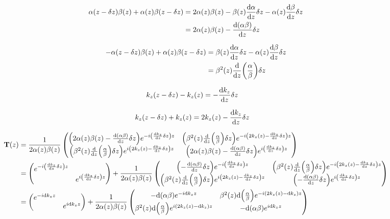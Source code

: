 \begin{align*}
	\alpha\pqty{z-\delta z}\beta\pqty{z} + \alpha\pqty{z}\beta\pqty{z - \delta z} 
	&= 2\alpha\pqty{z}\beta\pqty{z} - \beta\pqty{z}\dv{\alpha}{z}\delta z - \alpha\pqty{z}\dv{\beta}{z}\delta z \\
	&= 2\alpha\pqty{z}\beta\pqty{z} - \dv{\pqty{\alpha\beta}}{z}\delta z
\end{align*}

\begin{align*}
	-\alpha\pqty{z-\delta z}\beta\pqty{z} + \alpha\pqty{z}\beta\pqty{z - \delta z} 
	&= \beta\pqty{z}\dv{\alpha}{z}\delta z - \alpha\pqty{z}\dv{\beta}{z}\delta z \\
	&= \beta^2\pqty{z}\dv{z}\pqty{\frac{\alpha}{\beta}}\delta z
\end{align*}

\begin{align*}
	k_{z}\pqty{z - \delta z}-k_{z}\pqty{z} &= -\dv{k_z}{z}\delta z
\end{align*}

\begin{align*}
	k_{z}\pqty{z - \delta z} + k_{z}\pqty{z} &= 2k_{z}\pqty{z} - \dv{k_z}{z}\delta z
\end{align*}

\begin{align*}
	\vb{T}\pqty{z} &= \frac{1}{2\alpha\pqty{z}\beta\pqty{z}}\pmqty{
		\pqty{2\alpha\pqty{z}\beta\pqty{z} - \dv{\pqty{\alpha\beta}}{z}\delta z}e^{-i\pqty{\dv{k_z}{z}\delta z}z} &
		\pqty{\beta^2\pqty{z}\dv{z}\pqty{\frac{\alpha}{\beta}}\delta z}e^{-i\pqty{2k_{z}\pqty{z} - \dv{k_z}{z}\delta z}z} \\
		\pqty{\beta^2\pqty{z}\dv{z}\pqty{\frac{\alpha}{\beta}}\delta z}e^{i\pqty{2k_{z}\pqty{z} - \dv{k_z}{z}\delta z}z} &
		\pqty{2\alpha\pqty{z}\beta\pqty{z} - \dv{\pqty{\alpha\beta}}{z}\delta z}e^{i\pqty{\dv{k_z}{z}\delta z}z}
		} \\
		&= \pmqty{e^{-i\pqty{\dv{k_z}{z}\delta z}z} & \\ & e^{i\pqty{\dv{k_z}{z}\delta z}z}} + \frac{1}{2\alpha\pqty{z}\beta\pqty{z}}\pmqty{
		\pqty{ - \dv{\pqty{\alpha\beta}}{z}\delta z}e^{-i\pqty{\dv{k_z}{z}\delta z}z} &
		\pqty{\beta^2\pqty{z}\dv{z}\pqty{\frac{\alpha}{\beta}}\delta z}e^{-i\pqty{2k_{z}\pqty{z} - \dv{k_z}{z}\delta z}z} \\
		\pqty{\beta^2\pqty{z}\dv{z}\pqty{\frac{\alpha}{\beta}}\delta z}e^{i\pqty{2k_{z}\pqty{z} - \dv{k_z}{z}\delta z}z} &
		\pqty{ - \dv{\pqty{\alpha\beta}}{z}\delta z}e^{i\pqty{\dv{k_z}{z}\delta z}z}
		} \\
		&= \pmqty{e^{-i\dd{k_z}z} & \\ & e^{i\dd{k_z}z}} + \frac{1}{2\alpha\pqty{z}\beta\pqty{z}}\pmqty{
		- \dd\pqty{\alpha\beta}e^{-i\dd{k_z}z} &
		\beta^2\pqty{z}\dd\pqty{\frac{\alpha}{\beta}}e^{-i\pqty{2k_{z}\pqty{z} - \dd{k_z}}z} \\
		\beta^2\pqty{z}\dd\pqty{\frac{\alpha}{\beta}}e^{i\pqty{2k_{z}\pqty{z} - \dd{k_z}}z} &
		- \dd\pqty{\alpha\beta}e^{i\dd{k_z}z}
		}
\end{align*}

